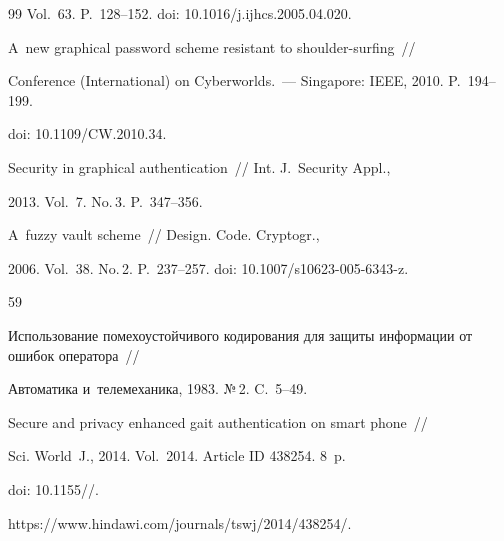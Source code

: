 {{\begin{thebibliography}{99}
Vol.~63. P.~128--152. doi: 10.1016\!/\!j.ijhcs.2005.04.020.







 A~new graphical password scheme resistant to shoulder-surfing~/\!\!/ 


{Conference (International) on Cyberworlds}.~--- Singapore: IEEE, 2010. P.~194--199. 


{doi: 10.1109\!/\!CW.2010.34}.









Security in graphical authentication~/\!\!/ {Int. J.~Security  Appl.},


 2013. Vol.~7. No.\,3. P.~347--356.










 A~fuzzy vault scheme~/\!\!/ {Design. Code. Cryptogr.}, 


2006. Vol.~38. No.\,2. P.~237--257. doi: 10.1007\!/\!s10623-005-6343-z.





 59




Использование помехоустойчивого кодирования для защиты информации от ошибок оператора~/\!\!/


{Автоматика и~телемеханика}, 1983. №\,2. C.~5--49.









Secure and privacy enhanced gait authentication on smart phone~/\!\!/ 


{Sci. World~J.}, 2014. Vol.~2014. Article ID 438254. 8~p.


doi: 10.1155\!/\!/.


{\sf https://www.hindawi.com/journals/tswj/2014/438254/}.









\end{thebibliography}}}

